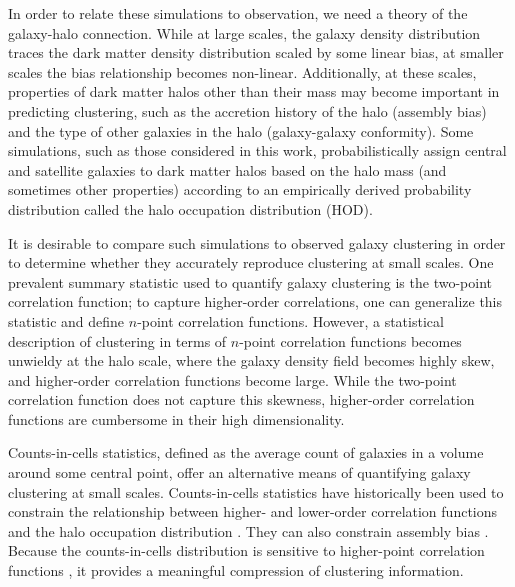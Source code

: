 \documentclass[fleqn,usenatbib]{mnras}
\begin{document}
In order to relate these simulations to observation, we need a theory of the galaxy-halo connection. While at large scales, the galaxy density distribution traces the dark matter density distribution scaled by some linear bias, at smaller scales the bias relationship becomes non-linear. Additionally, at these scales, properties of dark matter halos other than their mass may become important in predicting clustering, such as the accretion history of the halo (assembly bias) and the type of other galaxies in the halo (galaxy-galaxy conformity). Some simulations, such as those considered in this work, probabilistically assign central and satellite galaxies to dark matter halos based on the halo mass (and sometimes other properties) according to an empirically derived probability distribution called the halo occupation distribution (HOD).

It is desirable to compare such simulations to observed galaxy clustering in order to determine whether they accurately reproduce clustering at small scales. One prevalent summary statistic used to quantify galaxy clustering is the two-point correlation function; to capture higher-order correlations, one can generalize this statistic and define $n$-point correlation functions. However, a statistical description of clustering in terms of $n$-point correlation functions becomes unwieldy at the halo scale, where the galaxy density field becomes highly skew, and higher-order correlation functions become large. While the two-point correlation function does not capture this skewness, higher-order correlation functions are cumbersome in their high dimensionality. 

Counts-in-cells statistics, defined as the average count of galaxies in a volume around some central point, offer an alternative means of quantifying galaxy clustering at small scales.  Counts-in-cells statistics have historically been used to constrain the relationship between higher- and lower-order correlation functions \citep{fry_statistical_1978, balian_galaxies_1988, alimi_nonlinear_1990, gaztanaga_high-order_1994, colombi_count_nodate, szapudi_higher_2002} and the halo occupation distribution \citep{blanton_scale_2006, oguri_inferring_2015, reid_constraining_2009, wang_evidence_2022}. They can also constrain assembly bias \citep{pearl_desi_2023}. Because the counts-in-cells distribution is sensitive to higher-point correlation functions \citep{peebles_large-scale_1980}, it provides a meaningful compression of clustering information.
\end{document}
